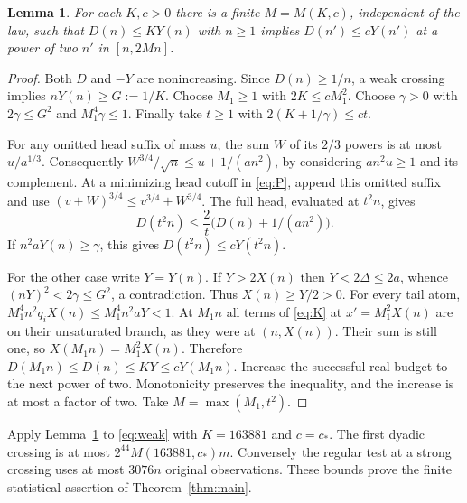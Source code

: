 \documentclass[11pt]{article}
\newtheorem{lemma}[theorem]{Lemma}
\begin{document}
\begin{lemma}\label{lem:dilate}
For each $K,c>0$ there is a finite $M=M(K,c)$, independent of the law, such that $D(n)\le K Y(n)$ with $n\ge1$ implies $D(n')\le cY(n')$ at a power of two $n'$ in $[n,2Mn]$.
\end{lemma}
\begin{proof}
Both $D$ and $-Y$ are nonincreasing. Since $D(n)\ge1/n$, a weak crossing implies $nY(n)\ge G:=1/K$. Choose $M_1\ge1$ with $2K\le c M_1^2$. Choose $\gamma>0$ with $2\gamma\le G^2$ and $M_1^4\gamma\le1$. Finally take $t\ge1$ with $2(K+1/\gamma)\le ct$.

For any omitted head suffix of mass $u$, the sum $W$ of its $2/3$ powers is at most $u/a^{1/3}$. Consequently $W^{3/4}/\sqrt n\le u+1/(an^2)$, by considering $an^2u\ge1$ and its complement. At a minimizing head cutoff in \eqref{eq:P}, append this omitted suffix and use $(v+W)^{3/4}\le v^{3/4}+W^{3/4}$. The full head, evaluated at $t^2n$, gives
\[
        D(t^2n)\le\frac2t\big(D(n)+1/(an^2)\big).
\]
If $n^2aY(n)\ge\gamma$, this gives $D(t^2n)\le cY(t^2n)$.

For the other case write $Y=Y(n)$. If $Y>2X(n)$ then $Y<2\Delta\le2a$, whence $(nY)^2<2\gamma\le G^2$, a contradiction. Thus $X(n)\ge Y/2>0$. For every tail atom, $M_1^4 n^2q_iX(n)\le M_1^4 n^2aY<1$. At $M_1n$ all terms of \eqref{eq:K} at $x'=M_1^2 X(n)$ are on their unsaturated branch, as they were at $(n,X(n))$. Their sum is still one, so $X(M_1n)=M_1^2X(n)$. Therefore $D(M_1n)\le D(n)\le KY\le cY(M_1n)$. Increase the successful real budget to the next power of two. Monotonicity preserves the inequality, and the increase is at most a factor of two. Take $M=\max(M_1,t^2)$.
\end{proof}

Apply Lemma~\ref{lem:dilate} to \eqref{eq:weak} with $K=163881$ and $c=c_*$. The first dyadic crossing is at most $2^{44}M(163881,c_*)m$. Conversely the regular test at a strong crossing uses at most $3076n$ original observations. These bounds prove the finite statistical assertion of Theorem~\ref{thm:main}.




\end{document}
